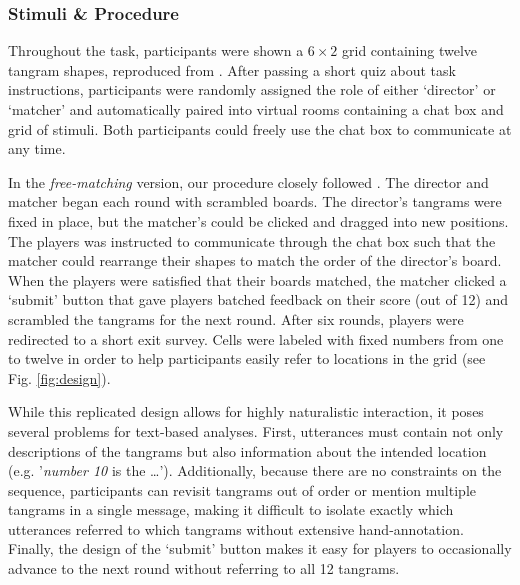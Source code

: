 \subsubsection{Stimuli \& Procedure}\label{stimuli}

Throughout the task, participants were shown a \(6 \times 2\) grid containing twelve tangram shapes, reproduced from \cite{ClarkWilkesGibbs86_ReferringCollaborative}.  
After passing a short quiz about task instructions, participants were randomly assigned the role of either `director' or `matcher' and automatically paired into virtual rooms containing a chat box and grid of stimuli. 
Both participants could freely use the chat box to communicate at any time. 

In the \emph{free-matching} version, our procedure closely followed \cite{ClarkWilkesGibbs86_ReferringCollaborative}. 
The director and matcher began each round with scrambled boards. 
The director's tangrams were fixed in place, but the matcher's could be clicked and dragged into new positions.
The players was instructed to communicate through the chat box such that the matcher could  rearrange their shapes to match the order of the director's board.
When the players were satisfied that their boards matched, the matcher clicked a `submit' button that gave players batched feedback on their score (out of 12) and scrambled the tangrams for the next round. 
After six rounds, players were redirected to a short exit survey. 
Cells were labeled with fixed numbers from one to twelve in order to help participants easily refer to locations in the grid (see Fig. \ref{fig:design}).

While this replicated design allows for highly naturalistic interaction, it poses several problems for text-based analyses. First, utterances must contain not only descriptions of the tangrams but also information about the intended location (e.g. '\emph{number 10} is the \dots'). Additionally, because there are no constraints on the sequence, participants can revisit tangrams out of order or mention multiple tangrams in a single message, making it difficult to isolate exactly which utterances referred to which tangrams without extensive hand-annotation. Finally, the design of the `submit' button makes it easy for players to occasionally advance to the next round without referring to all 12 tangrams. 

